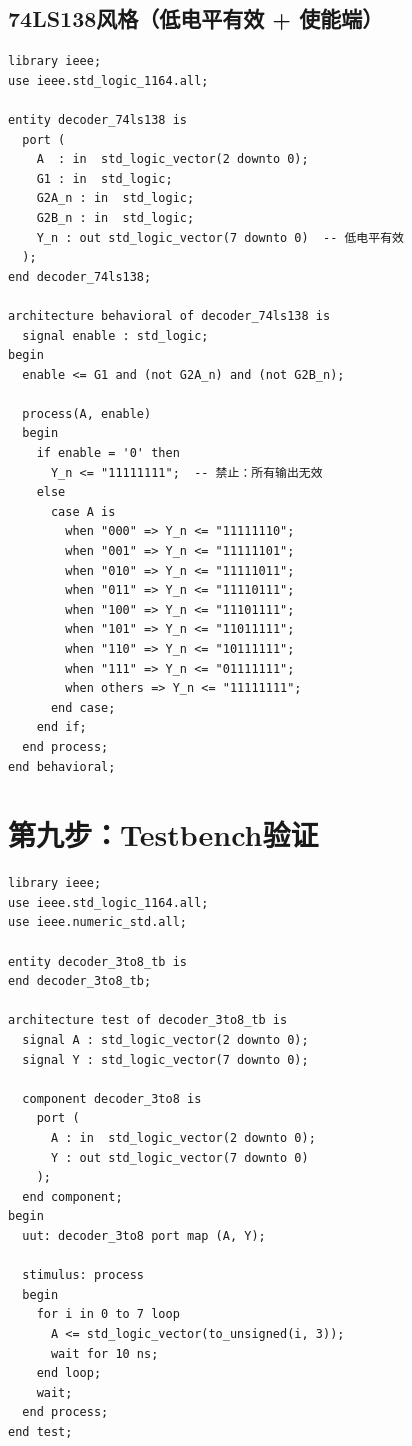 \subsection{74LS138风格（低电平有效 + 使能端）}

\begin{lstlisting}[caption={74LS138风格译码器}]
library ieee;
use ieee.std_logic_1164.all;

entity decoder_74ls138 is
  port (
    A  : in  std_logic_vector(2 downto 0);
    G1 : in  std_logic;
    G2A_n : in  std_logic;
    G2B_n : in  std_logic;
    Y_n : out std_logic_vector(7 downto 0)  -- 低电平有效
  );
end decoder_74ls138;

architecture behavioral of decoder_74ls138 is
  signal enable : std_logic;
begin
  enable <= G1 and (not G2A_n) and (not G2B_n);

  process(A, enable)
  begin
    if enable = '0' then
      Y_n <= "11111111";  -- 禁止：所有输出无效
    else
      case A is
        when "000" => Y_n <= "11111110";
        when "001" => Y_n <= "11111101";
        when "010" => Y_n <= "11111011";
        when "011" => Y_n <= "11110111";
        when "100" => Y_n <= "11101111";
        when "101" => Y_n <= "11011111";
        when "110" => Y_n <= "10111111";
        when "111" => Y_n <= "01111111";
        when others => Y_n <= "11111111";
      end case;
    end if;
  end process;
end behavioral;
\end{lstlisting}

\section{第九步：Testbench验证}

\begin{lstlisting}[caption={3-8译码器Testbench}]
library ieee;
use ieee.std_logic_1164.all;
use ieee.numeric_std.all;

entity decoder_3to8_tb is
end decoder_3to8_tb;

architecture test of decoder_3to8_tb is
  signal A : std_logic_vector(2 downto 0);
  signal Y : std_logic_vector(7 downto 0);

  component decoder_3to8 is
    port (
      A : in  std_logic_vector(2 downto 0);
      Y : out std_logic_vector(7 downto 0)
    );
  end component;
begin
  uut: decoder_3to8 port map (A, Y);

  stimulus: process
  begin
    for i in 0 to 7 loop
      A <= std_logic_vector(to_unsigned(i, 3));
      wait for 10 ns;
    end loop;
    wait;
  end process;
end test;
\end{lstlisting}

